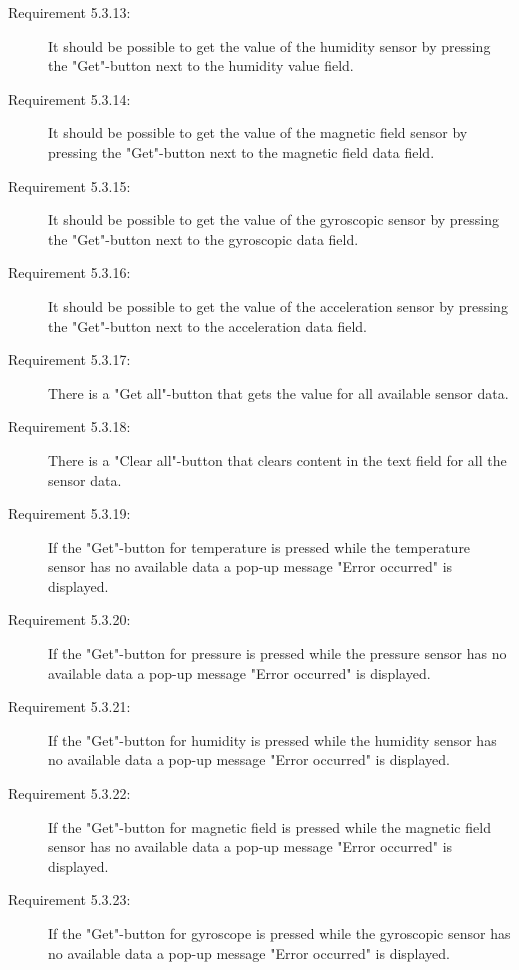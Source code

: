 \documentclass[a4paper]{article}
\begin{document}
\begin{description}
\item[Requirement 5.3.13:] It should be possible to get the value of the humidity sensor by pressing the "Get"-button next to the humidity value field.

\item[Requirement 5.3.14:] It should be possible to get the value of the magnetic field sensor by pressing the "Get"-button next to the magnetic field data field.

\item[Requirement 5.3.15:] It should be possible to get the value of the gyroscopic sensor by pressing the "Get"-button next to the gyroscopic data field.

\item[Requirement 5.3.16:] It should be possible to get the value of the acceleration sensor by pressing the "Get"-button next to the acceleration data field.

\item[Requirement 5.3.17:] There is a "Get all"-button that gets the value for all available sensor data.

\item[Requirement 5.3.18:] There is a "Clear all"-button that clears content in the text field for all the sensor data.

\item[Requirement 5.3.19:] If the "Get"-button for temperature is pressed while the temperature sensor has no available data a pop-up message "Error occurred" is displayed.

\item[Requirement 5.3.20:] If the "Get"-button for pressure is pressed while the pressure sensor has no available data a pop-up message "Error occurred" is displayed.

\item[Requirement 5.3.21:] If the "Get"-button for humidity is pressed while the humidity sensor has no available data a pop-up message "Error occurred" is displayed.

\item[Requirement 5.3.22:] If the "Get"-button for magnetic field is pressed while the magnetic field sensor has no available data a pop-up message "Error occurred" is displayed.

\item[Requirement 5.3.23:] If the "Get"-button for gyroscope is pressed while the gyroscopic sensor has no available data a pop-up message "Error occurred" is displayed.


\end{description}
\end{document}
